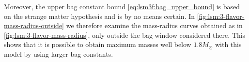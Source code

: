 Moreover, the upper bag constant bound \eqref{eq:lsm3f:bag_upper_bound} is based on the strange matter hypothesis and is by no means certain.
In \cref{fig:lsm:3-flavor-mass-radius-outside} we therefore examine the mass-radius curves obtained as in \cref{fig:lsm:3-flavor-mass-radius}, only outside the bag window considered there.
This shows that it is possible to obtain maximum masses well below $1.8 M_\odot$ with this model by using larger bag constants.






